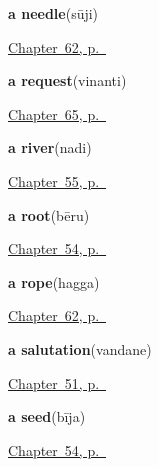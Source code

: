 \noindent\begin{minipage}[t]{\linewidth}
\raggedright
\textbf{a needle}\enspace\emph{}\enspace(sūji)\par
\footnotesize \hyperref[ch:ka-made]{Chapter~62, p.~\pageref*{ch:ka-made}}
\end{minipage}\par\smallskip

\noindent\begin{minipage}[t]{\linewidth}
\raggedright
\textbf{a request}\enspace\emph{}\enspace(vinanti)\par
\footnotesize \hyperref[ch:ka-manners]{Chapter~65, p.~\pageref*{ch:ka-manners}}
\end{minipage}\par\smallskip

\noindent\begin{minipage}[t]{\linewidth}
\raggedright
\textbf{a river}\enspace\emph{}\enspace(nadi)\par
\footnotesize \hyperref[ch:ka-river-road]{Chapter~55, p.~\pageref*{ch:ka-river-road}}
\end{minipage}\par\smallskip

\noindent\begin{minipage}[t]{\linewidth}
\raggedright
\textbf{a root}\enspace\emph{}\enspace(bēru)\par
\footnotesize \hyperref[ch:ka-tree]{Chapter~54, p.~\pageref*{ch:ka-tree}}
\end{minipage}\par\smallskip

\noindent\begin{minipage}[t]{\linewidth}
\raggedright
\textbf{a rope}\enspace\emph{}\enspace(hagga)\par
\footnotesize \hyperref[ch:ka-made]{Chapter~62, p.~\pageref*{ch:ka-made}}
\end{minipage}\par\smallskip

\noindent\begin{minipage}[t]{\linewidth}
\raggedright
\textbf{a salutation}\enspace\emph{}\enspace(vandane)\par
\footnotesize \hyperref[ch:ka-courtesy]{Chapter~51, p.~\pageref*{ch:ka-courtesy}}
\end{minipage}\par\smallskip

\noindent\begin{minipage}[t]{\linewidth}
\raggedright
\textbf{a seed}\enspace\emph{}\enspace(bīja)\par
\footnotesize \hyperref[ch:ka-tree]{Chapter~54, p.~\pageref*{ch:ka-tree}}
\end{minipage}\par\smallskip

